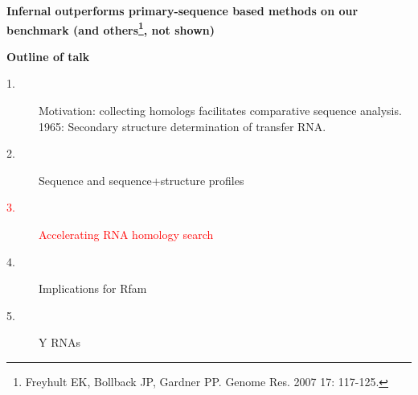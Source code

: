 \documentclass[landscape]{slides}
\begin{document}
\begin{slide}
\begin{center}

\textbf{Infernal outperforms primary-sequence based methods on our
  benchmark (and others\footnote{Freyhult EK, Bollback JP, Gardner
    PP. Genome Res. 2007 17: 117-125.}, not shown)}

\end{center}
\medskip


\vfill 
\end{slide}
\begin{slide}
\begin{center}
\textbf{Outline of talk}

\begin{description}
\item[1.] Motivation: collecting homologs facilitates comparative
  sequence analysis.\\ 1965: Secondary structure determination of
  transfer RNA.
\item[2.] Sequence and sequence+structure profiles
\item[\textcolor{red}{3.}] \textcolor{red}{Accelerating RNA homology search}
\item[4.] Implications for Rfam
\item[5.] Y RNAs
\end{description}

\end{center}
\vfill
\end{slide}
\end{document}
